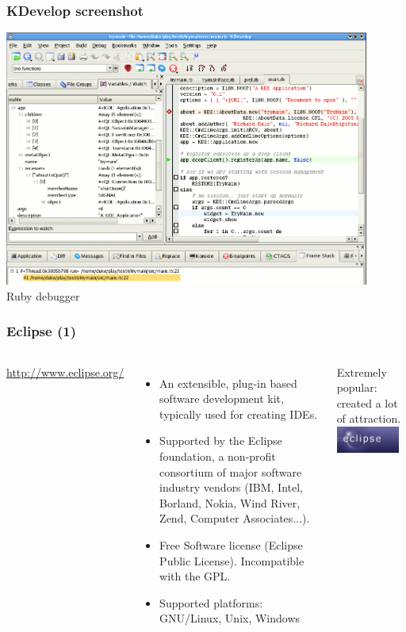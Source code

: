 \begin{frame}
  \frametitle{KDevelop screenshot}
  \begin{center}
    \includegraphics[width=0.9\textwidth]{slides/sysdev-application-development/kdevelop-screenshot.png}\\
    Ruby debugger
  \end{center}
\end{frame}

\begin{frame}
  \frametitle{Eclipse (1)}
  \begin{columns}[T]
    \url{http://www.eclipse.org/}
    \begin{itemize}
    \item An extensible, plug-in based software development kit,
      typically used for creating IDEs.
    \item Supported by the Eclipse foundation, a non-profit consortium
      of major software industry vendors (IBM, Intel, Borland, Nokia,
      Wind River, Zend, Computer Associates...).
    \item Free Software license (Eclipse Public License). Incompatible
      with the GPL.
    \item Supported platforms: GNU/Linux, Unix, Windows
    \end{itemize}
    Extremely popular: created a lot of attraction.
    \includegraphics[width=0.9\textwidth]{slides/sysdev-application-development/eclipse.png}
  \end{columns}
\end{frame}

